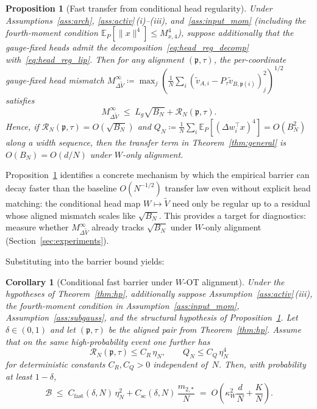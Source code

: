 \documentclass[11pt]{article}
\newtheorem{proposition}[theorem]{Proposition}
\newtheorem{corollary}[theorem]{Corollary}
\newcommand{\E}{\mathbb{E}}
\newcommand{\cB}{\mathcal{B}}
\newcommand{\nperm}{\mathfrak{p}}  %
\begin{document}
\begin{proposition}[Fast transfer from conditional head regularity]
\label{prop:transfer_struct}
Under Assumptions~\ref{ass:arch}, \ref{ass:activ}\,(i)--(iii),
and~\ref{ass:input_mom} (including the fourth-moment condition
$\E_P[\|x\|^4] \le M_{x,4}^4$),
suppose additionally that the
gauge-fixed heads admit the decomposition~\eqref{eq:head_reg_decomp}
with~\eqref{eq:head_reg_lip}. Then for any alignment $(\nperm,\tau)$,
the per-coordinate gauge-fixed head mismatch
$M_{\Delta \tilde V}^\infty
\coloneqq
\max_{j} (\frac{1}{N}\sum_{i}
(\tilde v_{A,i} - P_\tau \tilde v_{B,\nperm(i)})_j^2)^{1/2}$
satisfies
\begin{equation}\label{eq:head_mismatch_struct}
  M_{\Delta \tilde V}^\infty
  \;\le\;
  L_g \sqrt{B_N} + \mathcal R_N(\nperm,\tau).
\end{equation}
Hence, if $\mathcal R_N(\nperm,\tau) = O(\sqrt{B_N})$
and $Q_N \coloneqq \frac{1}{N}\sum_{i} \E_P[(\Delta w_i^\top x)^4]
= O(B_N^2)$ along a width sequence, then the transfer
term in Theorem~\ref{thm:general} is $O(B_N) = O(d/N)$
under $W$-only alignment.
\end{proposition}

Proposition~\ref{prop:transfer_struct} identifies a concrete mechanism
by which the empirical barrier can decay faster than the baseline
$O(N^{-1/2})$ transfer law even without explicit head matching:
the conditional head map $W \mapsto \tilde V$ need only be regular
up to a residual whose aligned mismatch scales like $\sqrt{B_N}$.
This provides a target for diagnostics:
measure whether $M_{\Delta \tilde V}^\infty$ already tracks
$\sqrt{B_N}$ under $W$-only alignment
(Section~\ref{sec:experiments}).

Substituting into the barrier bound yields:

\begin{corollary}[Conditional fast barrier under $W$-OT alignment]
\label{cor:struct_rate}
Under the hypotheses of Theorem~\ref{thm:hp},
additionally suppose Assumption~\ref{ass:activ}\,(iii),
the fourth-moment condition in Assumption~\ref{ass:input_mom},
Assumption~\ref{ass:subgauss},
and the structural hypothesis of
Proposition~\ref{prop:transfer_struct}.
Let $\delta \in (0,1)$ and let $(\nperm,\tau)$ be the aligned pair from
Theorem~\ref{thm:hp}.
Assume that on the same high-probability event one further has
\begin{equation}\label{eq:struct_aux}
  \mathcal R_N(\nperm,\tau) \le C_R\,\eta_N,
  \qquad
  Q_N \le C_Q\,\eta_N^4
\end{equation}
for deterministic constants $C_R, C_Q > 0$ independent of~$N$.
Then, with probability at least $1-\delta$,
\begin{equation}\label{eq:struct_rate}
  \boxed{
  \cB
  \;\le\;
  C_{\mathrm{fast}}(\delta,N)\,\eta_N^2
  + C_{\mathrm{sc}}(\delta,N)\,\frac{m_{2,*}}{N}
  \;=\;
  O\!\left(\kappa_W^2\frac{d}{N} + \frac{K}{N}\right).
  }
\end{equation}
\end{corollary}
\end{document}
